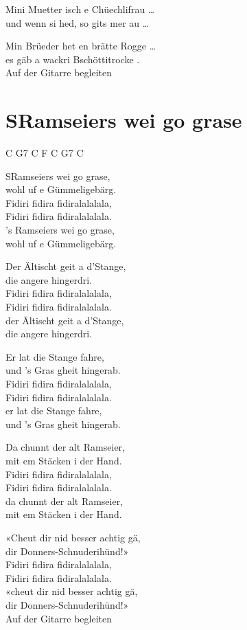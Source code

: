\documentclass[
  letterpaper,
  a5paper]{memoir}
\begin{document}
Mini Muetter isch e Chüechlifrau \ldots{}\\
und wenn si hed, so git\textquotesingle s mer au \ldots{}

Min Brüeder het en brätte Rogge \ldots{}\\
es gäb a wackri Bschöttitrocke .\\
Auf der Gitarre begleiten

\hypertarget{sramseiers-wei-go-grase}{%
\chapter{S\textquotesingle Ramseiers wei go
grase}\label{sramseiers-wei-go-grase}}

C G7 C F C G7 C

S\textquotesingle Ramseiers wei go grase,\\
wohl uf e Gümmeligebärg.\\
Fidiri fidira fidiralalalala,\\
Fidiri fidira fidiralalalala.\\
's Ramseiers wei go grase,\\
wohl uf e Gümmeligebärg.

Der Ältischt geit a d'Stange,\\
die angere hingerdri.\\
Fidiri fidira fidiralalalala,\\
Fidiri fidira fidiralalalala.\\
der Ältischt geit a d'Stange,\\
die angere hingerdri.

Er lat die Stange fahre,\\
und 's Gras gheit hingerab.\\
Fidiri fidira fidiralalalala,\\
Fidiri fidira fidiralalalala.\\
er lat die Stange fahre,\\
und 's Gras gheit hingerab.

Da chunnt der alt Ramseier,\\
mit em Stäcken i der Hand.\\
Fidiri fidira fidiralalalala,\\
Fidiri fidira fidiralalalala.\\
da chunnt der alt Ramseier,\\
mit em Stäcken i der Hand.

«Cheut dir nid besser achtig gä,\\
dir Donners-Schnuderihünd!»\\
Fidiri fidira fidiralalalala,\\
Fidiri fidira fidiralalalala.\\
«cheut dir nid besser achtig gä,\\
dir Donners-Schnuderihünd!»\\
Auf der Gitarre begleiten
\end{document}
